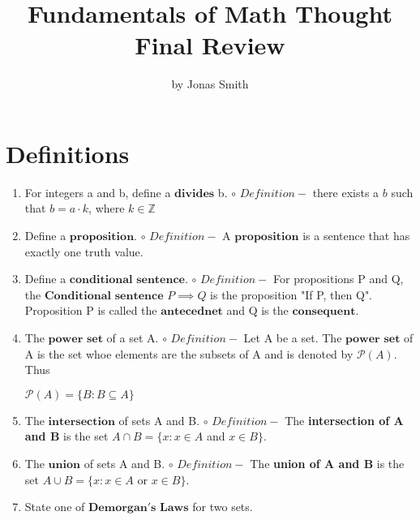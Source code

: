 \documentclass[11pt]{article}
\begin{document}
\author{by Jonas Smith}
\title{Fundamentals of Math Thought Final Review}
\maketitle

\medskip

\section*{Definitions}
\begin{enumerate}
    \item For integers a and b, define a $\mathbf{divides}$ b.
        \newline $\circ$ $Definition - $ there exists a $b$ such that $b=a\cdot k$, where $k \in \mathbb{Z}$
    \item Define a $\mathbf{proposition}$.
        \newline $\circ$ $Definition - $ A $\mathbf{proposition}$ is a sentence that has exactly one truth value.
    \item Define a $\mathbf{conditional}$ $\mathbf{sentence}$.
        \newline $\circ$ $Definition - $ For propositions P and Q, the $\mathbf{Conditional}$ $\mathbf{sentence}$ $P\implies Q$ is the proposition "If P, then Q". Proposition P is called the $\mathbf{antecednet}$ and Q is the $\mathbf{consequent}$.
    \item The $\mathbf{power}$ $\mathbf{set}$ of a set A.
        \newline $\circ$ $Definition - $ Let A be a set. The $\mathbf{power}$ $\mathbf{set}$ of A is the set whoe elements are the subsets of A and is denoted by $\mathscr{P}(A)$. Thus
        \begin{center}
            $\mathscr{P}(A) = \{B:B\subseteq A\}$
        \end{center}
    \item The $\mathbf{intersection}$ of sets A and B.
        \newline $\circ$ $Definition - $ The \textbf{intersection of A and B} is the set $A \cap B = \{ x:x \in A$ and $x \in B \}$.
    \item The $\mathbf{union}$ of sets A and B.
        \newline $\circ$ $Definition - $ The \textbf{union of A and B} is the set $A\cup B = \{ x:x \in A$ or $x\in B \}.$
    \item State one of $\mathbf{Demorgan's}$ $\mathbf{Laws}$ for two sets.

\end{enumerate}
\end{document}

